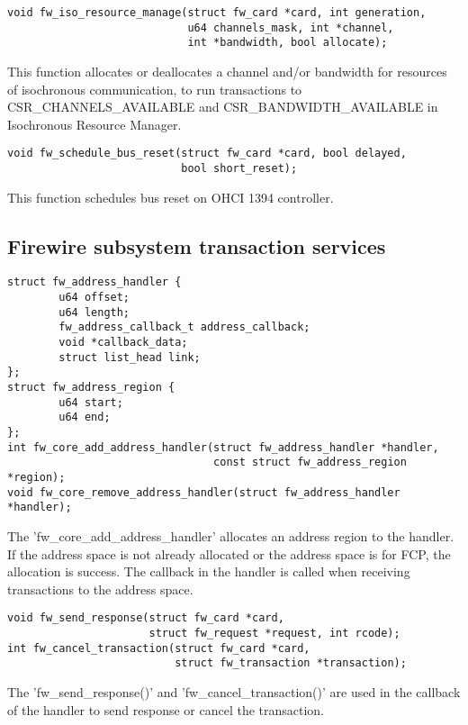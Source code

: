 \documentclass[onecolumn]{article}
\begin{document}
\begin{verbatim}
void fw_iso_resource_manage(struct fw_card *card, int generation,
                            u64 channels_mask, int *channel,
                            int *bandwidth, bool allocate);
\end{verbatim}

This function allocates or deallocates a channel and/or bandwidth for resources of isochronous communication, to run transactions to CSR\_CHANNELS\_AVAILABLE and CSR\_BANDWIDTH\_AVAILABLE in Isochronous Resource Manager.

\begin{verbatim}
void fw_schedule_bus_reset(struct fw_card *card, bool delayed,
                           bool short_reset);
\end{verbatim}

This function schedules bus reset on OHCI 1394 controller.

\subsection{Firewire subsystem transaction services}

\begin{verbatim}
struct fw_address_handler {
        u64 offset;
        u64 length;
        fw_address_callback_t address_callback;
        void *callback_data;
        struct list_head link;
};
struct fw_address_region {
        u64 start;
        u64 end;
};
int fw_core_add_address_handler(struct fw_address_handler *handler,
                                const struct fw_address_region *region);
void fw_core_remove_address_handler(struct fw_address_handler *handler);
\end{verbatim}

The 'fw\_core\_add\_address\_handler' allocates an address region to the handler. If the address space is not already allocated or the address space is for FCP, the allocation is success. The callback in the handler is called when receiving transactions to the address space.

\begin{verbatim}
void fw_send_response(struct fw_card *card,
                      struct fw_request *request, int rcode);
int fw_cancel_transaction(struct fw_card *card,
                          struct fw_transaction *transaction);
\end{verbatim}

The 'fw\_send\_response()' and 'fw\_cancel\_transaction()' are used in the callback of the handler to send response or cancel the transaction.
\end{document}
